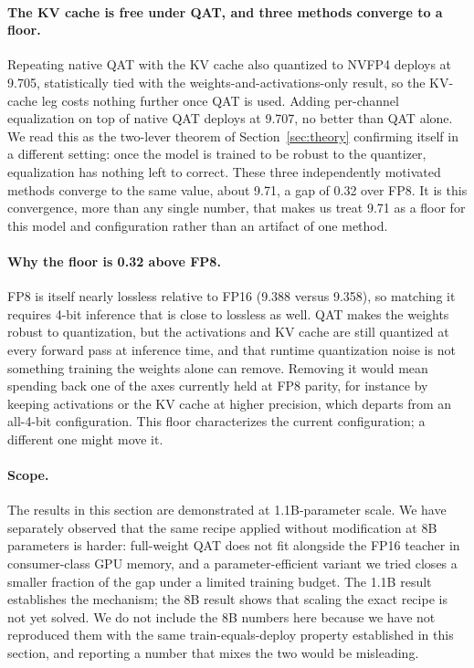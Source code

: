 \documentclass[11pt]{article}
\begin{document}
\paragraph{The KV cache is free under QAT, and three methods converge to a floor.}
Repeating native QAT with the KV cache also quantized to NVFP4 deploys at 9.705,
statistically tied with the weights-and-activations-only result, so the KV-cache leg
costs nothing further once QAT is used. Adding per-channel equalization on top of native
QAT deploys at 9.707, no better than QAT alone. We read this as the two-lever theorem of
Section~\ref{sec:theory} confirming itself in a different setting: once the model is
trained to be robust to the quantizer, equalization has nothing left to correct. These
three independently motivated methods converge to the same value, about 9.71, a gap of
0.32 over FP8. It is this convergence, more than any single number, that makes us treat
9.71 as a floor for this model and configuration rather than an artifact of one method.

\paragraph{Why the floor is 0.32 above FP8.} FP8 is itself nearly lossless relative to
FP16 (9.388 versus 9.358), so matching it requires 4-bit inference that is close to
lossless as well. QAT makes the weights robust to quantization, but the activations and
KV cache are still quantized at every forward pass at inference time, and that runtime
quantization noise is not something training the weights alone can remove. Removing it
would mean spending back one of the axes currently held at FP8 parity, for instance by
keeping activations or the KV cache at higher precision, which departs from an
all-4-bit configuration. This floor characterizes the current configuration; a
different one might move it.

\paragraph{Scope.} The results in this section are demonstrated at 1.1B-parameter scale.
We have separately observed that the same recipe applied without modification at 8B
parameters is harder: full-weight QAT does not fit alongside the FP16 teacher in
consumer-class GPU memory, and a parameter-efficient variant we tried closes a smaller
fraction of the gap under a limited training budget. The 1.1B result establishes the
mechanism; the 8B result shows that scaling the exact recipe is not yet solved. We do
not include the 8B numbers here because we have not reproduced them with the same
train-equals-deploy property established in this section, and reporting a number that
mixes the two would be misleading.
\end{document}
